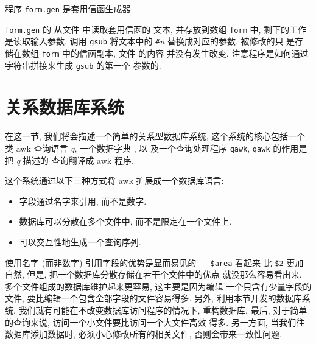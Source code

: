 程序 \verb'form.gen' 是套用信函生成器:

\verb'form.gen' 的 \BEGIN 从文件  中读取套用信函的
文本, 并存放到数组 \verb'form' 中, 剩下的工作是读取输入参数, 调用 
\verb'gsub' 将文本中的 \verb'#'\textit{n} 替换成对应的参数, 被修改的只 
是存储在数组 \verb'form' 中的信函副本, 文件  的内容
并没有发生改变. 注意程序是如何通过字符串拼接来生成 \verb'gsub' 的第一个
参数的.

\section{关系数据库系统}
\label{sec:a_relational_database_system}

在这一节, 我们将会描述一个简单的关系型数据库系统, 这个系统的核心包括一个
类 awk 查询语言 \textit{q}, 一个数据字典 , 以
及一个查询处理程序 \verb'qawk', \verb'qawk' 的作用是把 \textit{q} 描述的
查询翻译成 awk 程序.

这个系统通过以下三种方式将 awk 扩展成一个数据库语言:
\begin{itemize}
    \item 字段通过名字来引用, 而不是数字.
    \item 数据库可以分散在多个文件中, 而不是限定在一个文件上.
    \item 可以交互性地生成一个查询序列.
\end{itemize}
使用名字 (而非数字) 引用字段的优势是显而易见的 --- \verb'$area' 看起来
比 \verb'$2' 更加自然, 但是, 把一个数据库分散存储在若干个文件中的优点
就没那么容易看出来. 多个文件组成的数据库维护起来更容易, 这主要是因为编辑
一个只含有少量字段的文件, 要比编辑一个包含全部字段的文件容易得多. 另外,
利用本节开发的数据库系统, 我们就有可能在不改变数据库访问程序的情况下,
重构数据库. 最后, 对于简单的查询来说, 访问一个小文件要比访问一个大文件高效
得多. 另一方面, 当我们往数据库添加数据时, 必须小心修改所有的相关文件, 
否则会带来一致性问题.

